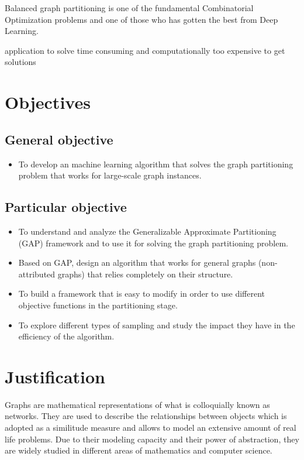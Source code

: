 Balanced graph partitioning is one of the fundamental Combinatorial Optimization problems and one of those who has gotten the best from Deep Learning.

application to solve 
time consuming and computationally too expensive to get solutions
 

\section{Objectives}

\subsection{General objective}
\begin{itemize}
    \item To develop an machine learning algorithm that solves the graph partitioning problem that works for large-scale graph instances.
\end{itemize}
\subsection{Particular objective}
\begin{itemize}
    \item To understand and analyze the Generalizable Approximate Partitioning (GAP) framework and to use it for solving the graph partitioning problem.
    \item Based on GAP, design an algorithm that works for general graphs (non-attributed graphs) that relies completely on their structure.
    \item To build a framework that is easy to modify in order to use different objective functions in the partitioning stage.
    \item To explore different types of sampling and study the impact they have in the efficiency of the algorithm.
\end{itemize}
\section{Justification}

Graphs are mathematical representations of what is colloquially known as networks. They are used to describe the relationships between objects which is adopted as a similitude measure and allows to model an extensive amount of real life problems. Due to their modeling capacity and their power of abstraction, they are widely studied in different areas of mathematics and computer science. 

